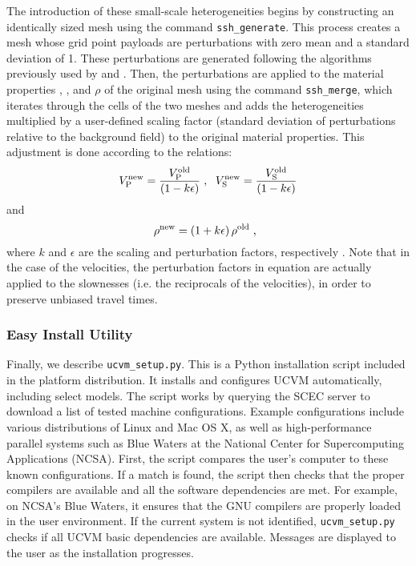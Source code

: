 The introduction of these small-scale heterogeneities begins by constructing an identically sized mesh using the command \texttt{ssh\_generate}. This process creates a mesh whose grid point payloads are perturbations with zero mean and a standard deviation of 1. These perturbations are generated following the algorithms previously used by \citet{Withers_2013_SCEC} and \citet{Savran_2014_SSA}. Then, the perturbations are applied to the material properties \vp{}, \vs{}, and $\rho$ of the original mesh using the command \texttt{ssh\_merge}, which iterates through the cells of the two meshes and adds the heterogeneities multiplied by a user-defined scaling factor (standard deviation of perturbations relative to the background field) to the original material properties. This adjustment is done according to the relations:
%
\begin{equation}
\label{eq:ssh.vel}
V_{\mathrm{P}}^{\mathrm{new}} = \frac{ V_{\mathrm{P}}^{\mathrm{old}} }{ (1 - k \epsilon) }
	\hspace{0.3em},
	\hspace{0.6em}
V_{\mathrm{S}}^{\mathrm{new}} = \frac{ V_{\mathrm{S}}^{\mathrm{old}} }{ (1 - k \epsilon) }
\end{equation}
%
and
%
\begin{equation}
\label{eq:ssh.density}
\rho^{\mathrm{new}} = (1 + k \epsilon) \, \rho^{\mathrm{old}}
	\hspace{0.3em},
	\hspace{0.6em}
\end{equation}
%
where $k$ and $\epsilon$ are the scaling and perturbation factors, respectively \citep[see][]{Withers_2013_SCEC, Savran_2014_SSA}. Note that in the case of the velocities, the perturbation factors in equation  are actually applied to the slownesses (i.e. the reciprocals of the velocities), in order to preserve unbiased travel times.

\subsubsection{Easy Install Utility}
\label{sec:easy.install}

Finally, we describe \texttt{ucvm\_setup.py}. This is a Python installation script included in the platform distribution. It installs and configures UCVM automatically, including select models. The script works by querying the SCEC server to download a list of tested machine configurations. Example configurations include various distributions of Linux and Mac OS X, as well as high-performance parallel systems such as Blue Waters at the National Center for Supercomputing Applications (NCSA). First, the script compares the user's computer to these known configurations. If a match is found, the script then checks that the proper compilers are available and all the software dependencies are met. For example, on NCSA's Blue Waters, it ensures that the GNU compilers are properly loaded in the user environment. If the current system is not identified, \texttt{ucvm\_setup.py} checks if all UCVM basic dependencies are available. Messages are displayed to the user as the installation progresses.


